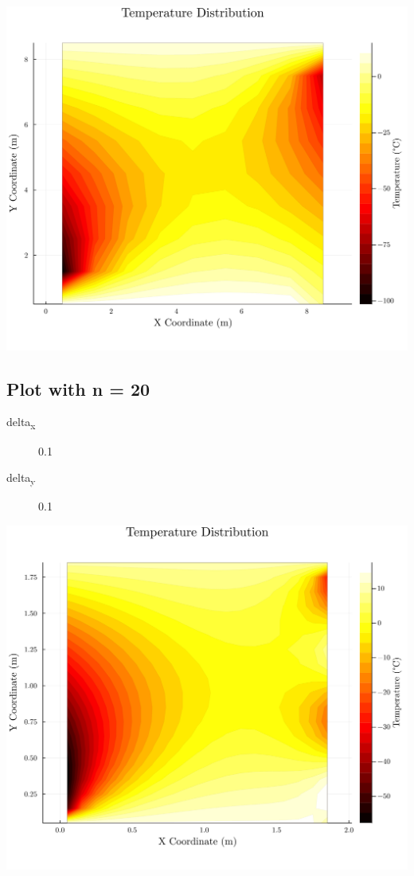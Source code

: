 \documentclass[11pt]{article}
\begin{document}
\begin{center}
\includegraphics[width=.9\linewidth]{./plot2.png}
\end{center}
\subsection{Plot with n = 20}
\label{sec:org0e0ff05}

\begin{description}
\item[{delta\textsubscript{x}}] 0.1
\item[{delta\textsubscript{y}}] 0.1
\end{description}
\begin{center}
\includegraphics[width=.9\linewidth]{./plot1.png}
\end{center}
\end{document}
